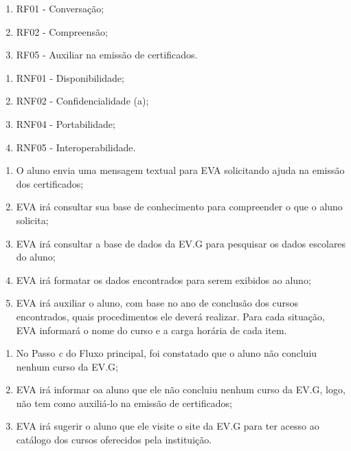     \begin{enumerate}[label=\alph*)]
        \tightlist
        \item RF01 - Conversação;
        \item RF02 - Compreensão;
        \item RF05 - Auxiliar na emissão de certificados.
    \end{enumerate}
        
    \begin{enumerate}[label=\alph*)]
        \tightlist
        \item RNF01 - Disponibilidade;
        \item RNF02 - Confidencialidade (a);
        \item RNF04 - Portabilidade;
        \item RNF05 - Interoperabilidade.
    \end{enumerate}
        
    \begin{enumerate}[label=\alph*)]
        \tightlist
        \item O aluno envia uma mensagem textual para EVA solicitando ajuda na emissão dos certificados;
        \item EVA irá consultar sua base de conhecimento para compreender o que o aluno solicita;
        \item EVA irá consultar a base de dados da EV.G para pesquisar os dados escolares do aluno;
        \item EVA irá formatar os dados encontrados para serem exibidos ao aluno;
        \item EVA irá auxiliar o aluno, com base no ano de conclusão dos cursos encontrados, quais procedimentos ele deverá realizar. Para cada situação, EVA informará o nome do curso e a carga horária de cada item.
    \end{enumerate}
        
    \begin{enumerate}[label=\alph*)]
        \tightlist
        \item No Passo \textit{c}  do Fluxo principal, foi constatado que o aluno não concluiu nenhum curso da EV.G;
        \item EVA irá informar oa aluno que ele não concluiu nenhum curso da EV.G, logo, não tem como auxiliá-lo na emissão de certificados;
        \item EVA irá sugerir o aluno que ele visite o site da EV.G para ter acesso ao catálogo dos cursos oferecidos pela instituição.
    \end{enumerate}


